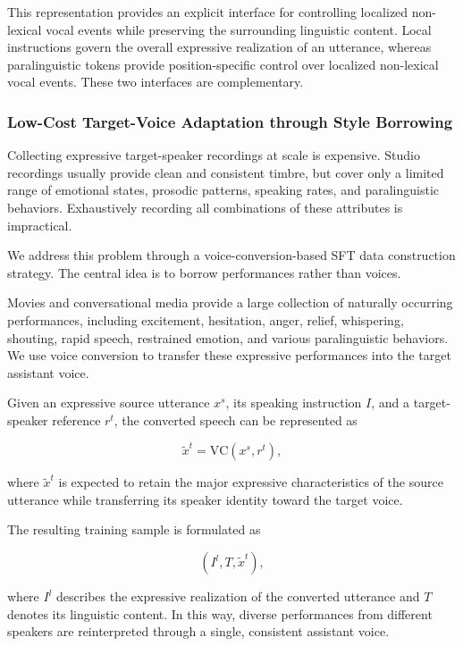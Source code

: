This representation provides an explicit interface for controlling localized non-lexical vocal events while preserving the surrounding linguistic content. Local instructions govern the overall expressive realization of an utterance,
whereas paralinguistic tokens provide position-specific control over localized
non-lexical vocal events. These two interfaces are complementary.


\subsubsection{Low-Cost Target-Voice Adaptation through Style Borrowing}

Collecting expressive target-speaker recordings at scale is expensive. Studio recordings usually provide clean and consistent timbre, but cover only a limited range of emotional states, prosodic patterns, speaking rates, and paralinguistic behaviors. Exhaustively recording all combinations of these attributes is impractical.

We address this problem through a voice-conversion-based SFT data construction strategy. The central idea is to borrow performances rather than voices.

Movies and conversational media provide a large collection of naturally occurring performances, including excitement, hesitation, anger, relief, whispering, shouting, rapid speech, restrained emotion, and various paralinguistic behaviors. We use voice conversion to transfer these expressive performances into the target assistant voice.

Given an expressive source utterance $x^{s}$, its speaking instruction $I$, and a target-speaker reference $r^{t}$, the converted speech can be represented as

\begin{equation}
\widetilde{x}^{t}
=
\mathrm{VC}
\left(
x^{s},
r^{t}
\right),
\end{equation}

where $\widetilde{x}^{t}$ is expected to retain the major expressive characteristics of the source utterance while transferring its speaker identity toward the target voice.

The resulting training sample is formulated as

\begin{equation}
\left(
I^{l},
T,
\widetilde{x}^{t}
\right),
\end{equation}

where $I^{l}$ describes the expressive realization of the converted utterance and $T$ denotes its linguistic content. In this way, diverse performances from different speakers are reinterpreted through a single, consistent assistant voice.

